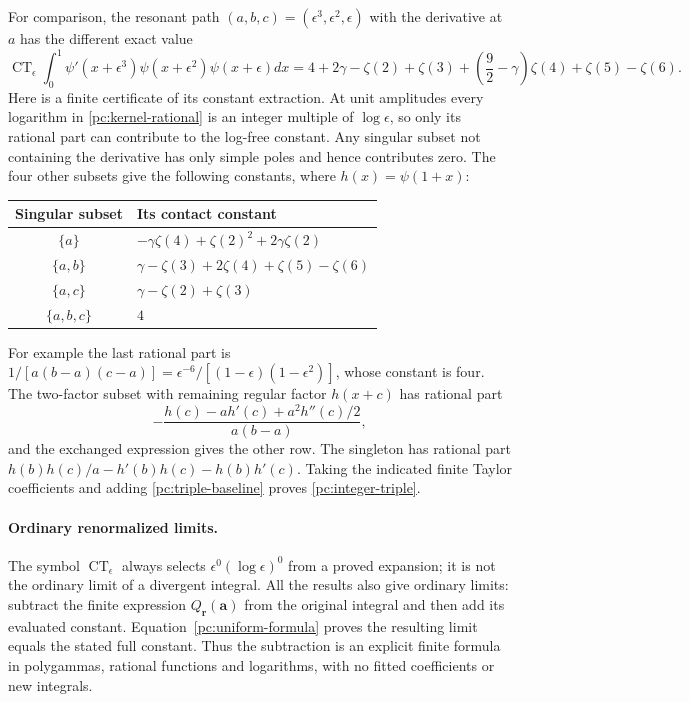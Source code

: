 \documentclass[11pt,a4paper]{article}
\theoremstyle{definition}
\theoremstyle{remark}
\numberwithin{equation}{section}
\begin{document}
For comparison, the resonant path $(a,b,c)=(\epsilon^3,\epsilon^2,
\epsilon)$ with the derivative at $a$ has the different exact value
\begin{equation}\label{pc:integer-triple}
 \boxed{\displaystyle
 \operatorname{CT}_{\epsilon}
   \int_0^1\psi'(x+\epsilon^3)\psi(x+\epsilon^2)
                            \psi(x+\epsilon)dx
 =4+2\gamma-\zeta(2)+\zeta(3)
       +\left(\frac92-\gamma\right)\zeta(4)
       +\zeta(5)-\zeta(6).}
\end{equation}
Here is a finite certificate of its constant extraction.
At unit amplitudes every logarithm in \eqref{pc:kernel-rational}
is an integer multiple of $\log\epsilon$, so only its rational part
can contribute to the log-free constant.  Any singular subset not
containing the derivative has only simple poles and hence contributes
zero.  The four other subsets give the following constants, where
$h(x)=\psi(1+x)$:
\begin{center}
\begin{tabular}{c|l}
Singular subset & Its contact constant\\\hline
$\{a\}$ & $-\gamma\zeta(4)+\zeta(2)^2+2\gamma\zeta(2)$\\
$\{a,b\}$ & $\gamma-\zeta(3)+2\zeta(4)+\zeta(5)-\zeta(6)$\\
$\{a,c\}$ & $\gamma-\zeta(2)+\zeta(3)$\\
$\{a,b,c\}$ & $4$
\end{tabular}
\end{center}
For example the last rational part is
$1/[a(b-a)(c-a)]=\epsilon^{-6}/[(1-\epsilon)(1-\epsilon^2)]$,
whose constant is four.  The two-factor subset with remaining
regular factor $h(x+c)$ has rational part
\[
 -\frac{h(c)-a h'(c)+a^2h''(c)/2}{a(b-a)},
\]
and the exchanged expression gives the other row.  The singleton
has rational part
$h(b)h(c)/a-h'(b)h(c)-h(b)h'(c)$.
Taking the indicated finite Taylor coefficients and adding
\eqref{pc:triple-baseline} proves \eqref{pc:integer-triple}.

\paragraph{Ordinary renormalized limits.}
The symbol $\operatorname{CT}_{\epsilon}$ always selects
$\epsilon^0(\log\epsilon)^0$ from a proved expansion; it is not the
ordinary limit of a divergent integral.  All the results also give
ordinary limits: subtract the finite expression
$Q_{\boldsymbol r}(\boldsymbol a)$ from the original integral and
then add its evaluated constant.  Equation~\eqref{pc:uniform-formula}
proves the resulting limit equals the stated full constant.  Thus the
subtraction is an explicit finite formula in polygammas, rational
functions and logarithms, with no fitted coefficients or new integrals.
\end{document}
